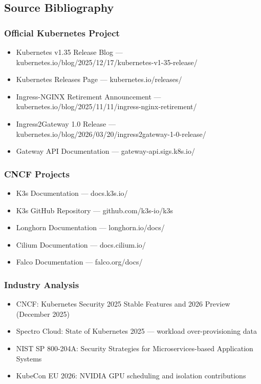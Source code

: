 \documentclass[11pt,letterpaper]{article}
\begin{document}
\subsection{Source Bibliography}

\subsubsection{Official Kubernetes Project}
\begin{itemize}[leftmargin=2em]
\item Kubernetes v1.35 Release Blog --- kubernetes.io/blog/2025/12/17/kubernetes-v1-35-release/
\item Kubernetes Releases Page --- kubernetes.io/releases/
\item Ingress-NGINX Retirement Announcement --- kubernetes.io/blog/2025/11/11/ingress-nginx-retirement/
\item Ingress2Gateway 1.0 Release --- kubernetes.io/blog/2026/03/20/ingress2gateway-1-0-release/
\item Gateway API Documentation --- gateway-api.sigs.k8s.io/
\end{itemize}

\subsubsection{CNCF Projects}
\begin{itemize}[leftmargin=2em]
\item K3s Documentation --- docs.k3s.io/
\item K3s GitHub Repository --- github.com/k3s-io/k3s
\item Longhorn Documentation --- longhorn.io/docs/
\item Cilium Documentation --- docs.cilium.io/
\item Falco Documentation --- falco.org/docs/
\end{itemize}

\subsubsection{Industry Analysis}
\begin{itemize}[leftmargin=2em]
\item CNCF: Kubernetes Security 2025 Stable Features and 2026 Preview (December 2025)
\item Spectro Cloud: State of Kubernetes 2025 --- workload over-provisioning data
\item NIST SP 800-204A: Security Strategies for Microservices-based Application Systems
\item KubeCon EU 2026: NVIDIA GPU scheduling and isolation contributions
\end{itemize}
\end{document}
